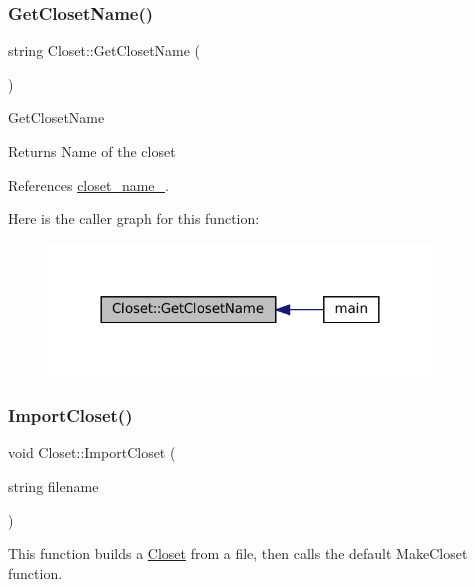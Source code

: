 \subsubsection{\texorpdfstring{Get\+Closet\+Name()}{GetClosetName()}}
{\footnotesize\ttfamily string Closet\+::\+Get\+Closet\+Name (\begin{DoxyParamCaption}{ }\end{DoxyParamCaption})}

Get\+Closet\+Name

\begin{DoxyReturn}{Returns}
Name of the closet 
\end{DoxyReturn}


References \mbox{\hyperlink{classCloset_a3c06676b90e6ebe31d6dd276f2f0bcef}{closet\+\_\+name\+\_\+}}.

Here is the caller graph for this function\+:\nopagebreak
\begin{figure}[H]
\begin{center}
\leavevmode
\includegraphics[width=288pt]{classCloset_a108ab29dacfccd5d1c958d5ec88ad64f_icgraph}
\end{center}
\end{figure}
\mbox{\label{classCloset_ac1057604430a855ca081cbfe16af10a5}} 
\subsubsection{\texorpdfstring{Import\+Closet()}{ImportCloset()}}
{\footnotesize\ttfamily void Closet\+::\+Import\+Closet (\begin{DoxyParamCaption}\item[{string}]{filename }\end{DoxyParamCaption})}



This function builds a \mbox{\hyperlink{classCloset}{Closet}} from a file, then calls the default \textquotesingle{}Make\+Closet\textquotesingle{} function. 

